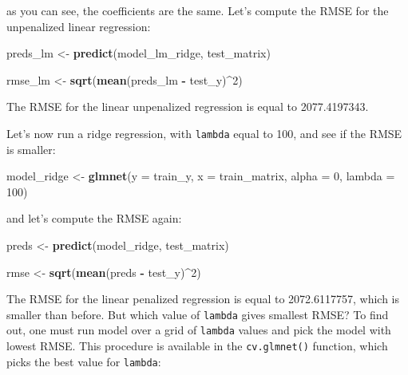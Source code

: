 \documentclass[]{gitbook}
\newenvironment{Shaded}{\begin{snugshade}}{\end{snugshade}}
\newcommand{\DataTypeTok}[1]{\textcolor[rgb]{0.13,0.29,0.53}{#1}}
\newcommand{\DecValTok}[1]{\textcolor[rgb]{0.00,0.00,0.81}{#1}}
\newcommand{\KeywordTok}[1]{\textcolor[rgb]{0.13,0.29,0.53}{\textbf{#1}}}
\newcommand{\NormalTok}[1]{#1}
\newcommand{\OperatorTok}[1]{\textcolor[rgb]{0.81,0.36,0.00}{\textbf{#1}}}
\newcommand{\StringTok}[1]{\textcolor[rgb]{0.31,0.60,0.02}{#1}}
\theoremstyle{definition}
\theoremstyle{definition}
\theoremstyle{definition}
\theoremstyle{remark}
\begin{document}
as you can see, the coefficients are the same. Let's compute the RMSE
for the unpenalized linear regression:

\begin{Shaded}
\begin{Highlighting}[]
\NormalTok{preds_lm <-}\StringTok{ }\KeywordTok{predict}\NormalTok{(model_lm_ridge, test_matrix)}

\NormalTok{rmse_lm <-}\StringTok{ }\KeywordTok{sqrt}\NormalTok{(}\KeywordTok{mean}\NormalTok{(preds_lm }\OperatorTok{-}\StringTok{ }\NormalTok{test_y)}\OperatorTok{^}\DecValTok{2}\NormalTok{)}
\end{Highlighting}
\end{Shaded}

The RMSE for the linear unpenalized regression is equal to 2077.4197343.

Let's now run a ridge regression, with \texttt{lambda} equal to 100, and
see if the RMSE is smaller:

\begin{Shaded}
\begin{Highlighting}[]
\NormalTok{model_ridge <-}\StringTok{ }\KeywordTok{glmnet}\NormalTok{(}\DataTypeTok{y =}\NormalTok{ train_y, }\DataTypeTok{x =}\NormalTok{ train_matrix, }\DataTypeTok{alpha =} \DecValTok{0}\NormalTok{, }\DataTypeTok{lambda =} \DecValTok{100}\NormalTok{)}
\end{Highlighting}
\end{Shaded}

and let's compute the RMSE again:

\begin{Shaded}
\begin{Highlighting}[]
\NormalTok{preds <-}\StringTok{ }\KeywordTok{predict}\NormalTok{(model_ridge, test_matrix)}

\NormalTok{rmse <-}\StringTok{ }\KeywordTok{sqrt}\NormalTok{(}\KeywordTok{mean}\NormalTok{(preds }\OperatorTok{-}\StringTok{ }\NormalTok{test_y)}\OperatorTok{^}\DecValTok{2}\NormalTok{)}
\end{Highlighting}
\end{Shaded}

The RMSE for the linear penalized regression is equal to 2072.6117757,
which is smaller than before. But which value of \texttt{lambda} gives
smallest RMSE? To find out, one must run model over a grid of
\texttt{lambda} values and pick the model with lowest RMSE. This
procedure is available in the \texttt{cv.glmnet()} function, which picks
the best value for \texttt{lambda}:
\end{document}
